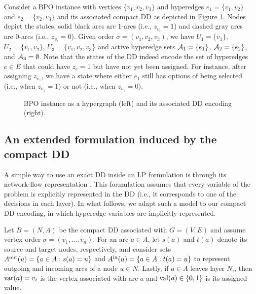 \begin{example}\label{exa:bpo-dd}
Consider a BPO instance with vertices $\{v_1, v_2, v_3\}$ and hyperedges $e_1=\{v_1, v_2\}$ and $ e_2=\{v_2, v_3\}$ and its associated compact DD as depicted in Figure \ref{fig:example-dd}. Nodes depict the states, solid black arcs are $1$-arcs (i.e., $z_{v_i}=1$) and dashed gray arcs are $0$-arcs (i.e., $z_{v_i}=0$). Given order $\sigma=(v_1,v_2,v_3)$, we have $U_1 = \{v_1\}$, $U_2 = \{v_1, v_2\}$, $U_3 = \{v_1, v_2, v_3\}$ and active hyperedge sets $\mathcal{A}_1 = \{e_1\}$, $\mathcal{A}_2 = \{e_2\}$, and $\mathcal{A}_3 = \emptyset$. Note that the states of the DD indeed encode the set of hyperedges $e\in E$ that could have $z_e = 1$ but have not yet been assigned. For instance, after assigning $z_{v_1}$, we have a state where either $e_1$ still has options of being selected (i.e., when $z_{v_1} =1$) or not (i.e.,  when $z_{v_1} = 0$).
\end{example}

\begin{figure}
	\centering
    
    \hspace{5em}
	
	\caption{BPO instance as a hypergraph (left) and its associated DD encoding (right).}
	\label{fig:example-dd}
\end{figure}


\subsection{An extended formulation induced by the compact DD}
\label{subsec:compact_DD_extended_formulation}

A simple way to use an exact DD inside an LP formulation is through its network-flow representation \cite{behle2007}. This formulation assumes that every variable of the problem is explicitly represented in the DD (i.e., it corresponds to one of the decisions in each layer).  In what follows, we adapt such a model to our compact DD encoding, in which hyperedge variables are implicitly represented. 

Let $B=(N,A)$ be the compact DD associated with $G=(V,E)$ and  assume vertex order $\sigma=(v_1,\ldots,v_n)$. For an arc $a\in A$, let $s(a)$ and $t(a)$ denote its source and target nodes, respectively, and consider sets $A^{\rm out}(u)=\{a\in A:s(a)=u\}$ and $A^{\rm in}(u)=\{a\in A:t(a)=u\}$ to represent outgoing and incoming arcs of a node $u \in N$. Lastly, if $a \in A$ leaves layer $N_i$, then $\operatorname{var}(a)=v_i$ is the vertex associated with arc $a$ and $\operatorname{val}(a)\in\{0,1\}$ is its assigned value.

